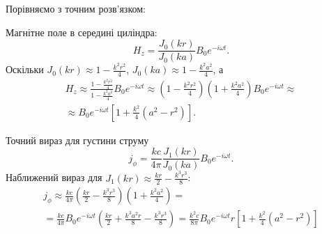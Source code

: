 \documentclass[]{ProblemBook}
\begin{document}
\begin{problem}
Порівняємо з точним розв'язком:

Магнітне поле в середині циліндра:
\[
    H_z = \frac{J_0(kr)}{J_0(ka)}B_0e^{-i\omega t}.
\]
Оскільки $J_0(kr) \approx 1 - \frac{k^2r^2}{4}$, $J_0(ka) \approx 1 - \frac{k^2a^2}{4}$, а
\begin{multline*}
    H_z \approx \frac{1 - \frac{k^2r^2}{4}}{1 - \frac{k^2a^2}{4}}B_0e^{-i\omega t} \approx \left( 1 - \frac{k^2r^2}{4} \right)\left( 1 + \frac{k^2a^2}{4} \right) B_0e^{-i\omega t} \approx\\\approx B_0e^{-i\omega t}\left[ 1 + \frac{k^2}{4}(a^2 - r^2)\right] .
\end{multline*}

Точний вираз для густини струму
\[
    j_\phi = \frac{kc}{4\pi}\frac{J_1(kr)}{J_0(ka)} B_0e^{-i\omega t}.
\]
Наближений вираз для $J_1(kr) \approx \frac{kr}{2} - \frac{k^3r^3}{8}$:
\begin{multline*}
   j_\phi \approx \frac{kc}{4\pi} \left( \frac{kr}{2} - \frac{k^3r^3}{8} \right) \left( 1 + \frac{k^2a^2}{4} \right) = \\ =
   \frac{kc}{4\pi} B_0e^{-i\omega t} \left( \frac{kr}{2}  + \frac{k^3a^2r}{8} - \frac{k^3r^3}{8} \right)   =  \frac{k^2c}{8\pi} B_0e^{-i\omega t} r\left[ 1 + \frac{k^2}{4}\left( a^2 - r^2\right) \right]
\end{multline*}

\begin{center}
\end{center}
\end{problem}
\end{document}
